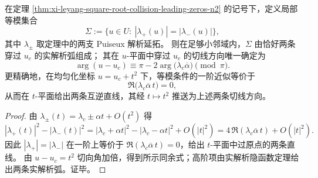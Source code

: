 \begin{proposition}[平方根分歧点的等模曲线切线方向]\label{prop:xi-leyang-equimodular-tangent-square-root}
在定理 \ref{thm:xi-leyang-square-root-collision-leading-zeros-n2} 的记号下，定义局部等模集合
\[
\Sigma:=\{u\in U:\ |\lambda_+(u)|=|\lambda_-(u)|\},
\]
其中 \(\lambda_\pm\) 取定理中的两支 Puiseux 解析延拓。
则在足够小邻域内，\(\Sigma\) 由恰好两条穿过 \(u_c\) 的实解析弧组成；
其在 \(u\)-平面中穿过 \(u_c\) 的切线方向唯一确定为
\[
\arg(u-u_c)\equiv \pi-2\arg\bigl(\lambda_c\overline{\alpha}\bigr)\pmod{\pi}.
\]
更精确地，在均匀化坐标 \(u=u_c+t^2\) 下，等模条件的一阶近似等价于
\[
\Re\bigl(\lambda_c\overline{\alpha}\,t\bigr)=0,
\]
从而在 \(t\)-平面给出两条互逆直线，其经 \(t\mapsto t^2\) 推送为上述两条切线方向。
\end{proposition}
\begin{proof}
由 \(\lambda_\pm(t)=\lambda_c\pm\alpha t+O(t^2)\) 得
\[
|\lambda_+(t)|^2-|\lambda_-(t)|^2
=|\lambda_c+\alpha t|^2-|\lambda_c-\alpha t|^2+O(|t|^2)
=4\,\Re(\lambda_c\overline{\alpha}\,t)+O(|t|^2).
\]
因此 \(|\lambda_+|=|\lambda_-|\) 在一阶上等价于 \(\Re(\lambda_c\overline{\alpha}\,t)=0\)，给出 \(t\)-平面中过原点的两条直线。
由 \(u-u_c=t^2\) 切向角加倍，得到所示同余式；高阶项由实解析隐函数定理给出两条实解析弧。证毕。
\end{proof}

